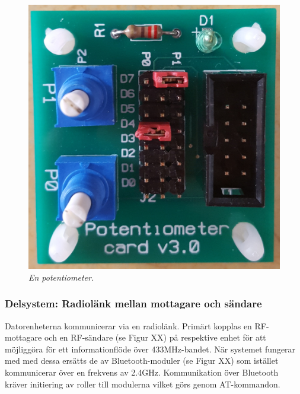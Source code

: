 \documentclass[a4paper]{article}
\begin{document}
\begin{figure}[H]
\includegraphics[scale=0.04]{Potentiometer.jpg}
\centering
\caption{\it En potentiometer.}
\end{figure} 




\subsubsection{Delsystem: Radiolänk mellan mottagare och sändare}
Datorenheterna kommunicerar via en radiolänk. Primärt kopplas en RF-mottagare och en RF-sändare (se Figur XX) på respektive enhet för att möjliggöra för ett informationflöde över 433MHz-bandet. När systemet fungerar med med dessa ersätts de av Bluetooth-moduler (se Figur XX) som istället kommunicerar över en frekvens av 2.4GHz. Kommunikation över Bluetooth kräver initiering av roller till modulerna vilket görs genom AT-kommandon. 
\end{document}
